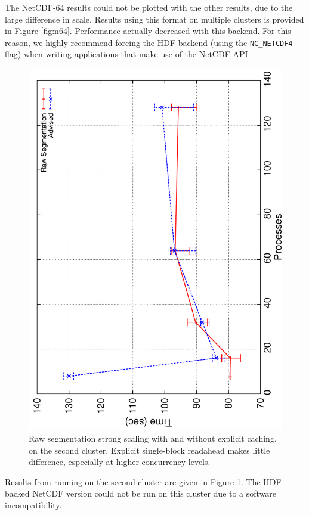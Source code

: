 The NetCDF-64 results could not be plotted with the other results, due
to the large difference in scale.  Results using this format on
multiple clusters is provided in Figure \ref{fig:n64}.  Performance
actually decreased with this backend.  For this reason, we highly
recommend forcing the HDF backend (using the \texttt{NC\_NETCDF4} flag)
when writing applications that make use of the NetCDF API.

\begin{figure}
  \centering
  \includegraphics[angle=270,width=\linewidth]{images/io/lh-most}
  \caption{Raw segmentation strong scaling with and without explicit
  caching, on the second cluster.  Explicit single-block readahead
  makes little difference, especially at higher concurrency levels.}
  \label{fig:lh-most}
\end{figure}

Results from running on the second cluster are given in Figure
\ref{fig:lh-most}.  The HDF-backed NetCDF version could not be run on
this cluster due to a software incompatibility.

